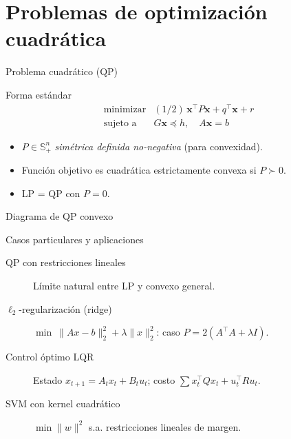 \documentclass[10pt,aspectratio=169]{beamer}
\newcommand{\x}{\mathbf{x}}
\newcommand{\0}{\mathbf{0}}
\begin{document}
\section{Problemas de optimización cuadrática}
\begin{frame}{Problema cuadrático (QP)}
  \begin{block}{Forma estándar}
    \[
      \begin{array}{ll}
        \text{minimizar} & (1/2)\,\x^\top P\x+q^\top\x+r \\
        \text{sujeto a}  & G\x\preceq h,\quad A\x=b
      \end{array}
    \]
  \end{block}
  \begin{itemize}
    \item $P\in\mathbb{S}_+^n$ \emph{simétrica definida no-negativa} (para convexidad).
    \item Función objetivo es cuadrática estrictamente convexa si $P\succ 0$.
    \item LP = QP con $P=0$.
  \end{itemize}
\end{frame}

\begin{frame}{Diagrama de QP convexo}
  \centering
\end{frame}

\begin{frame}{Casos particulares y aplicaciones}
  \begin{description}
    \item[QP con restricciones lineales] Límite natural entre LP y convexo general.
    \item[$\ell_2$-regularización (ridge)]
      $\min\ \|Ax-b\|_2^2+\lambda\|x\|_2^2$: caso $P=2(A^\top A+\lambda I)$.
    \item[Control óptimo LQR]
      Estado $x_{t+1}=A_tx_t+B_tu_t$; costo $\sum x_t^\top Qx_t+u_t^\top Ru_t$.
    \item[SVM con kernel cuadrático]
      $\min \|w\|^2$ s.a. restricciones lineales de margen.
  \end{description}
\end{frame}
\end{document}
